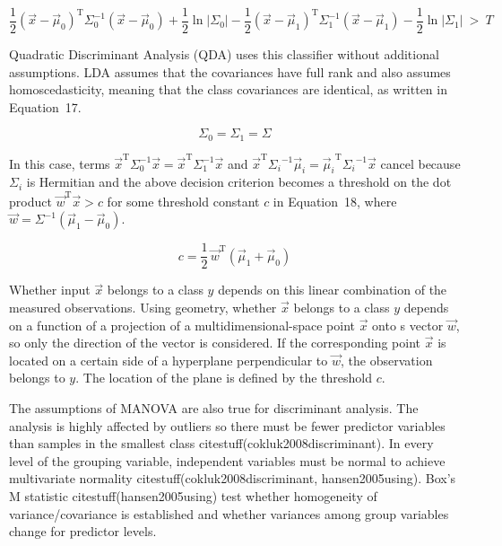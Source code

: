 \documentclass[preprint,12pt]{elsarticle}
\begin{document}
\begin{equation}
	{\frac{1}{2}}({\vec{x}}-{\vec{\mu}}_{0})^{\mathrm{T}}\Sigma_{0}^{-1}({\vec{x}}-{\vec{\mu}}_{0})+{\frac{1}{2}}\ln |\Sigma_{0}|-{\frac{1}{2}}({\vec{x}}-{\vec{\mu}}_{1})^{\mathrm{T}}\Sigma_{1}^{-1}({\vec{x}}-{\vec{\mu}}_{1})-{\frac{1}{2}}\ln |\Sigma_{1}|\ >\ T
	\label{eqn:16}
\end{equation}

Quadratic Discriminant Analysis (QDA) uses this classifier without additional assumptions. LDA assumes that the covariances have full rank and also assumes homoscedasticity, meaning that the class covariances are identical, as written in Equation~17.

\begin{equation}
	\Sigma_{0}=\Sigma_{1}=\Sigma
	\label{eqn:17}
\end{equation}

In this case, terms ${\vec{x}}^{\mathrm{T}}\Sigma_{0}^{-1}{\vec{x}}={\vec{x}}^{\mathrm{T}}\Sigma_{1}^{-1}{\vec{x}}$ and ${\vec{x}}^{\mathrm{T}}{\Sigma_{i}}^{-1}{\vec{\mu}}_{i}={{\vec{\mu}}_{i}}^{\mathrm{T}}{\Sigma_{i}}^{-1}{\vec{x}}$ cancel because $\Sigma_{i}$ is Hermitian and the above decision criterion becomes a threshold on the dot product ${\vec{w}}^{\mathrm{T}}{\vec{x}}>c$ for some threshold constant $c$ in Equation~18, where ${\vec{w}}=\Sigma ^{-1}({\vec{\mu}}_{1}-{\vec{\mu}}_{0})$.

\begin{equation}
	c={\frac{1}{2}}\,{\vec{w}}^{\mathrm{T}}({\vec{\mu}}_{1}+{\vec{\mu}}_{0})
	\label{eqn:18}
\end{equation}

Whether input $\vec{x}$ belongs to a class $y$ depends on this linear combination of the measured observations. Using geometry, whether $\vec{x}$ belongs to a class $y$ depends on a function of a projection of a multidimensional-space point $\vec{x}$ onto s vector $\vec{w}$, so only the direction of the vector is considered. If the corresponding point $\vec{x}$ is located on a certain side of a hyperplane perpendicular to $\vec{w}$, the observation belongs to $y$. The location of the plane is defined by the threshold $c$.

The assumptions of MANOVA are also true for discriminant analysis. The analysis is highly affected by outliers so there must be fewer predictor variables than samples in the smallest class citestuff(cokluk2008discriminant). In every level of the grouping variable, independent variables must be normal to achieve multivariate normality citestuff(cokluk2008discriminant, hansen2005using). Box's M statistic citestuff(hansen2005using) test whether homogeneity of variance/covariance is established and whether variances among group variables change for predictor levels. 
\end{document}
